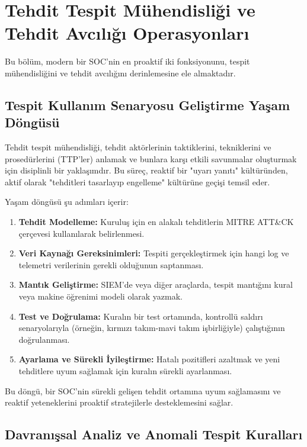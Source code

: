 \section{Tehdit Tespit Mühendisliği ve Tehdit Avcılığı Operasyonları}

Bu bölüm, modern bir SOC'nin en proaktif iki fonksiyonunu, tespit mühendisliğini ve tehdit avcılığını derinlemesine ele almaktadır.

\subsection{Tespit Kullanım Senaryosu Geliştirme Yaşam Döngüsü}

Tehdit tespit mühendisliği, tehdit aktörlerinin taktiklerini, tekniklerini ve prosedürlerini (TTP'ler) anlamak ve bunlara karşı etkili savunmalar oluşturmak için disiplinli bir yaklaşımdır. Bu süreç, reaktif bir "uyarı yanıtı" kültüründen, aktif olarak "tehditleri tasarlayıp engelleme" kültürüne geçişi temsil eder.

Yaşam döngüsü şu adımları içerir:
\begin{enumerate}
    \item \textbf{Tehdit Modelleme:} Kuruluş için en alakalı tehditlerin MITRE ATT\&CK çerçevesi kullanılarak belirlenmesi.
    \item \textbf{Veri Kaynağı Gereksinimleri:} Tespiti gerçekleştirmek için hangi log ve telemetri verilerinin gerekli olduğunun saptanması.
    \item \textbf{Mantık Geliştirme:} SIEM'de veya diğer araçlarda, tespit mantığını kural veya makine öğrenimi modeli olarak yazmak.
    \item \textbf{Test ve Doğrulama:} Kuralın bir test ortamında, kontrollü saldırı senaryolarıyla (örneğin, kırmızı takım-mavi takım işbirliğiyle) çalıştığının doğrulanması.
    \item \textbf{Ayarlama ve Sürekli İyileştirme:} Hatalı pozitifleri azaltmak ve yeni tehditlere uyum sağlamak için kuralın sürekli ayarlanması.
\end{enumerate}

Bu döngü, bir SOC'nin sürekli gelişen tehdit ortamına uyum sağlamasını ve reaktif yeteneklerini proaktif stratejilerle desteklemesini sağlar.

\subsection{Davranışsal Analiz ve Anomali Tespit Kuralları}

